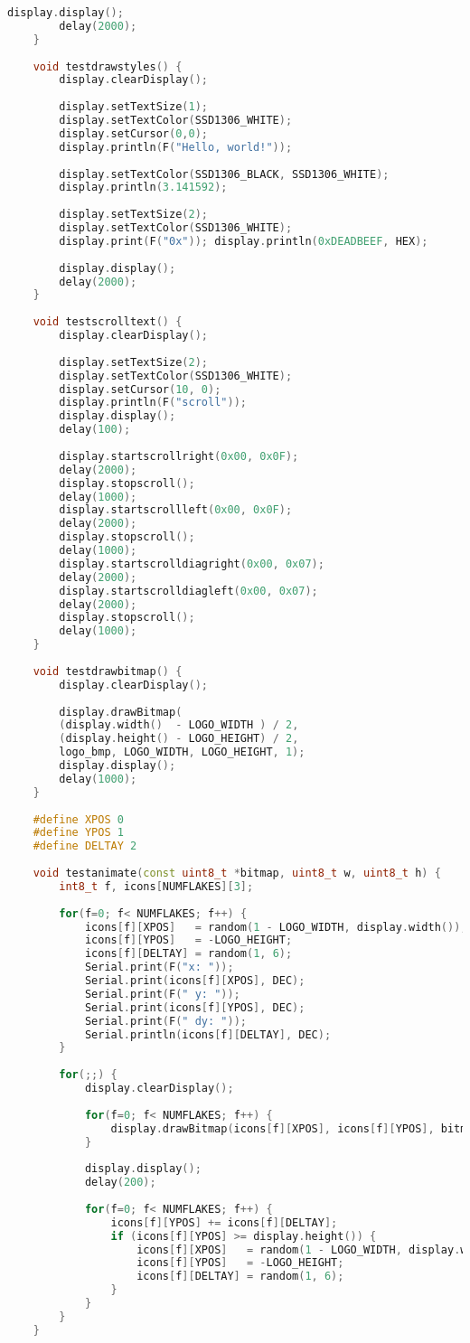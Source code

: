 \begin{code}
\begin{lstlisting}[language=c++]
		display.display();
		delay(2000);
	}
	
	void testdrawstyles() {
		display.clearDisplay();
		
		display.setTextSize(1);
		display.setTextColor(SSD1306_WHITE);
		display.setCursor(0,0);
		display.println(F("Hello, world!"));
		
		display.setTextColor(SSD1306_BLACK, SSD1306_WHITE);
		display.println(3.141592);
		
		display.setTextSize(2);
		display.setTextColor(SSD1306_WHITE);
		display.print(F("0x")); display.println(0xDEADBEEF, HEX);
		
		display.display();
		delay(2000);
	}
	
	void testscrolltext() {
		display.clearDisplay();
		
		display.setTextSize(2);
		display.setTextColor(SSD1306_WHITE);
		display.setCursor(10, 0);
		display.println(F("scroll"));
		display.display();
		delay(100);
		
		display.startscrollright(0x00, 0x0F);
		delay(2000);
		display.stopscroll();
		delay(1000);
		display.startscrollleft(0x00, 0x0F);
		delay(2000);
		display.stopscroll();
		delay(1000);
		display.startscrolldiagright(0x00, 0x07);
		delay(2000);
		display.startscrolldiagleft(0x00, 0x07);
		delay(2000);
		display.stopscroll();
		delay(1000);
	}
	
	void testdrawbitmap() {
		display.clearDisplay();
		
		display.drawBitmap(
		(display.width()  - LOGO_WIDTH ) / 2,
		(display.height() - LOGO_HEIGHT) / 2,
		logo_bmp, LOGO_WIDTH, LOGO_HEIGHT, 1);
		display.display();
		delay(1000);
	}
	
	#define XPOS 0
	#define YPOS 1
	#define DELTAY 2
	
	void testanimate(const uint8_t *bitmap, uint8_t w, uint8_t h) {
		int8_t f, icons[NUMFLAKES][3];
		
		for(f=0; f< NUMFLAKES; f++) {
			icons[f][XPOS]   = random(1 - LOGO_WIDTH, display.width());
			icons[f][YPOS]   = -LOGO_HEIGHT;
			icons[f][DELTAY] = random(1, 6);
			Serial.print(F("x: "));
			Serial.print(icons[f][XPOS], DEC);
			Serial.print(F(" y: "));
			Serial.print(icons[f][YPOS], DEC);
			Serial.print(F(" dy: "));
			Serial.println(icons[f][DELTAY], DEC);
		}
		
		for(;;) {
			display.clearDisplay();
			
			for(f=0; f< NUMFLAKES; f++) {
				display.drawBitmap(icons[f][XPOS], icons[f][YPOS], bitmap, w, h, SSD1306_WHITE);
			}
			
			display.display();
			delay(200);
			
			for(f=0; f< NUMFLAKES; f++) {
				icons[f][YPOS] += icons[f][DELTAY];
				if (icons[f][YPOS] >= display.height()) {
					icons[f][XPOS]   = random(1 - LOGO_WIDTH, display.width());
					icons[f][YPOS]   = -LOGO_HEIGHT;
					icons[f][DELTAY] = random(1, 6);
				}
			}
		}
	}
\end{lstlisting}      

\caption[Testprogramm für das OLED-Display]{Testprogramm für das OLED-Display}\label{Code:Testprogramm für das OLED-Display}    
\end{code} 

